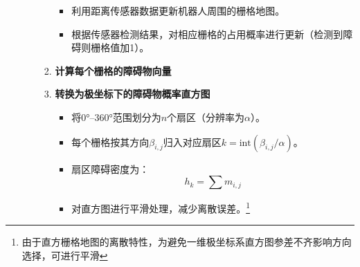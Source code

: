 \documentclass[../main.tex]{subfiles}
\begin{document}
\begin{enumerate}
\begin{itemize}
\begin{enumerate}
                        \begin{itemize}
                            \item {\small\kaishu 利用距离传感器数据更新机器人周围的栅格地图。}
                            \item {\small\kaishu 根据传感器检测结果，对相应栅格的占用概率进行更新（检测到障碍则栅格值加1）}。
                        \end{itemize}
                    \item \textbf{计算每个栅格的障碍物向量}  
                    
                    \item \textbf{转换为极坐标下的障碍物概率直方图}  
                        \begin{itemize}
                            \item {\small\kaishu 将0°–360°范围划分为$n$个扇区（分辨率为$\alpha$）。}  
                            \item {\small\kaishu 每个栅格按其方向$\beta_{i,j}$归入对应扇区$k = \text{int}(\beta_{i,j}/\alpha)$。  }
                            \item {\small\kaishu 扇区障碍密度为：}
                                \[
                                h_k = \sum m_{i,j}
                                \]
                            \item {\small\kaishu 对直方图进行平滑处理，减少离散误差。\footnote{由于直方栅格地图的离散特性，为避免一维极坐标系直方图参差不齐影响方向选择，可进行平滑}}  
                        \end{itemize}
                    

\end{enumerate}
\end{itemize}
\end{enumerate}
\end{document}
